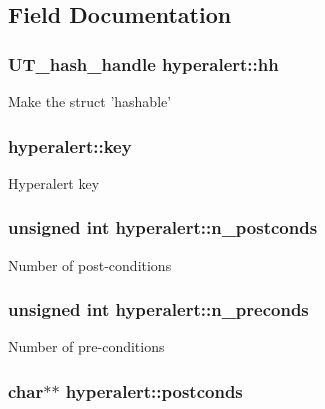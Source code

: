 \subsection{Field Documentation}
\hypertarget{structhyperalert_aa2993f19f3cc95627cfdaf4f47f78b04}{
\subsubsection[{hh}]{\setlength{\rightskip}{0pt plus 5cm}UT\_\-hash\_\-handle {\bf hyperalert::hh}}}
\label{structhyperalert_aa2993f19f3cc95627cfdaf4f47f78b04}
Make the struct 'hashable' \hypertarget{structhyperalert_a592c41f4772230c065ce352ec6c6cf0d}{
\subsubsection[{key}]{ {\bf hyperalert::key}}}
\label{structhyperalert_a592c41f4772230c065ce352ec6c6cf0d}
Hyperalert key \hypertarget{structhyperalert_a16c46535e62397b5ef394b014943f58a}{
\subsubsection[{n\_\-postconds}]{\setlength{\rightskip}{0pt plus 5cm}unsigned int {\bf hyperalert::n\_\-postconds}}}
\label{structhyperalert_a16c46535e62397b5ef394b014943f58a}
Number of post-\/conditions \hypertarget{structhyperalert_a84181558bdbb98e49087d4ce7353bf70}{
\subsubsection[{n\_\-preconds}]{\setlength{\rightskip}{0pt plus 5cm}unsigned int {\bf hyperalert::n\_\-preconds}}}
\label{structhyperalert_a84181558bdbb98e49087d4ce7353bf70}
Number of pre-\/conditions \hypertarget{structhyperalert_a69e0ed6e53e6fe23d3de2ec1f5d13863}{
\subsubsection[{postconds}]{\setlength{\rightskip}{0pt plus 5cm}char$\ast$$\ast$ {\bf hyperalert::postconds}}}
